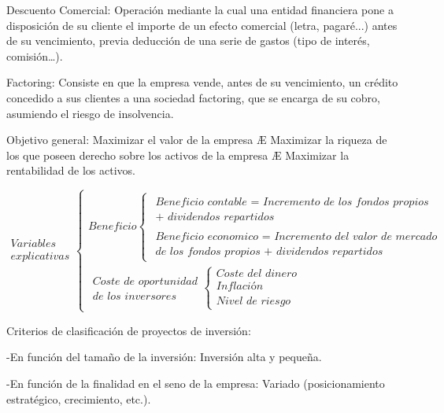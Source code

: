 \documentclass[12pt, twoside, openright]{report} %
\begin{document}
Descuento Comercial: Operación mediante la cual una entidad financiera pone a disposición de su cliente el importe de un efecto comercial (letra, pagaré...) antes de su vencimiento, previa deducción de una serie de gastos (tipo de interés, comisión…).

Factoring: Consiste en que la empresa vende, antes de su vencimiento, un crédito concedido a sus clientes a una sociedad factoring, que se encarga de su cobro, asumiendo el riesgo de insolvencia.

Objetivo general: Maximizar el valor de la empresa Æ Maximizar la riqueza de los que poseen derecho sobre los activos de la empresa Æ Maximizar la rentabilidad de los activos.

$$\begin{gathered}\textit{Variables } \\ \textit{explicativas}\end{gathered}
	\begin{cases}
		\textit{Beneficio} \begin{cases}
			\begin{gathered}\textit{Beneficio contable = Incremento de los fondos propios} \\  \textit{+ dividendos repartidos}\end{gathered} \\
			\begin{gathered}\textit{Beneficio economico = Incremento del valor de mercado} \\  \textit{de los fondos propios + dividendos repartidos} \end{gathered}
		\end{cases}       \\
		\begin{gathered}\textit{Coste de oportunidad}\\ \textit{de los inversores}\end{gathered} \begin{cases}
			\textit{Coste del dinero} \\
			\textit{Inflación}        \\
			\textit{Nivel de riesgo}
		\end{cases}
	\end{cases}$$

Criterios de clasificación de proyectos de inversión:

-En función del tamaño de la inversión: Inversión alta y pequeña.

-En función de la finalidad en el seno de la empresa: Variado (posicionamiento estratégico, crecimiento, etc.).
\end{document}
